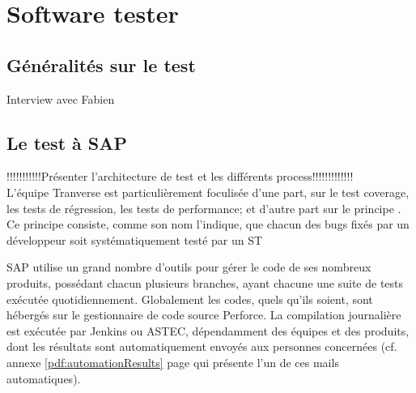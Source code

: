 \chapter{Software tester}
\section{G\'{e}n\'{e}ralit\'{e}s sur le test}
Interview avec Fabien




\section{Le test \`{a} SAP}

!!!!!!!!!!!Pr\'{e}senter l'architecture de test et les diff\'{e}rents process!!!!!!!!!!!!!\\

L'\'{e}quipe Tranverse est particuli\`{e}rement foculis\'{e}e d'une part, sur le test coverage, les tests de r\'{e}gression, les tests de performance; et d'autre part sur le principe . Ce principe consiste, comme son nom l'indique, que chacun des bugs fix\'{e}s par un d\'{e}veloppeur soit syst\'{e}matiquement test\'{e} par un ST

SAP utilise un grand nombre d'outils pour g\'{e}rer le code de ses nombreux produits, poss\'{e}dant chacun plusieurs branches, ayant chacune une suite de tests ex\'{e}cut\'{e}e quotidiennement. Globalement les codes, quels qu'ils soient, sont h\'{e}berg\'{e}s sur le gestionnaire de code source Perforce. La compilation journali\`{e}re est ex\'{e}cut\'{e}e par Jenkins ou ASTEC, d\'{e}pendamment des \'{e}quipes et des produits, dont les r\'{e}sultats sont automatiquement envoy\'{e}s aux personnes concern\'{e}es (cf. annexe \ref{pdf:automationResults} page \pageref{pdf:automationResults} qui pr\'{e}sente l'un de ces mails automatiques).\\



